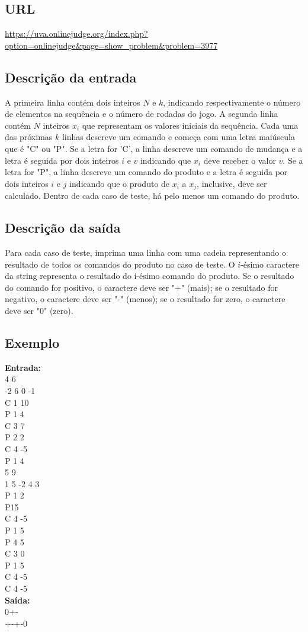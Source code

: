 \subsection{URL}
\url{https://uva.onlinejudge.org/index.php?option=onlinejudge&page=show_problem&problem=3977}

\subsection{Descrição da entrada}
A primeira linha contém dois inteiros $N$ e $k$, indicando respectivamente o número de elementos na sequência e o número de rodadas do jogo. A segunda linha contém $N$ inteiros $x_i$ que representam os valores iniciais da sequência. Cada uma das próximas $k$ linhas descreve um comando e começa com uma letra maiúscula que é "C" ou "P". Se a letra for 'C', a linha descreve um comando de mudança e a letra é seguida por dois inteiros $i$ e $v$ indicando que $x_i$ deve receber o valor $v$. Se a letra for "P", a linha descreve um comando do produto e a letra é seguida por dois inteiros $i$ e $j$ indicando que o produto de $x_i$ a $x_j$, inclusive, deve ser calculado. Dentro de cada caso de teste, há pelo menos um comando do produto.
\subsection{Descrição da saída}
Para cada caso de teste, imprima uma linha com uma cadeia representando o resultado de todos os comandos do produto no caso de teste. O $i$-ésimo caractere da string representa o resultado do i-ésimo comando do produto. Se o resultado do comando for positivo, o caractere deve ser "+" (mais); se o resultado for negativo, o caractere deve ser "-" (menos); se o resultado for zero, o caractere deve ser "0" (zero).
\subsection{Exemplo}
\textbf{Entrada:} \\
4 6 \\
-2 6 0 -1 \\
C 1 10 \\
P 1 4 \\
C 3 7 \\ 
P 2 2 \\
C 4 -5 \\
P 1 4 \\
5 9 \\
1 5 -2 4 3 \\
P 1 2 \\
P15 \\
C 4 -5 \\
P 1 5 \\ 
P 4 5 \\
C 3 0 \\ 
P 1 5 \\
C 4 -5 \\
C 4 -5 \\
\textbf{Saída:} \\
0+- \\
+-+-0 \\

